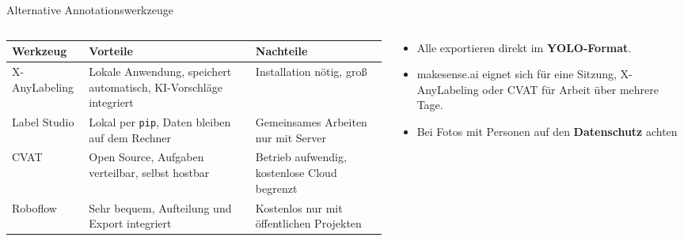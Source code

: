 \begin{frame}{Alternative Annotationswerkzeuge}
\footnotesize
\begin{columns}
\begin{column}{0.60\textwidth}
\centering
\scriptsize
\begin{tabular}{>{\raggedright\arraybackslash}p{}>{\raggedright\arraybackslash}p{}>{\raggedright\arraybackslash}p{}}
\toprule
\textbf{Werkzeug} & \textbf{Vorteile} & \textbf{Nachteile} \\
\midrule
X-AnyLabeling & Lokale Anwendung, speichert automatisch, KI-Vorschläge integriert & Installation nötig, groß \\
\midrule
Label Studio & Lokal per \texttt{pip}, Daten bleiben auf dem Rechner & Gemeinsames Arbeiten nur mit Server \\
\midrule
CVAT & Open Source, Aufgaben verteilbar, selbst hostbar & Betrieb aufwendig, kostenlose Cloud begrenzt \\
\midrule
Roboflow & Sehr bequem, Aufteilung und Export integriert & Kostenlos nur mit öffentlichen Projekten \\
\bottomrule
\end{tabular}
\end{column}
\begin{column}{0.35\textwidth}
\begin{itemize}
  \item Alle exportieren direkt im \textbf{YOLO-Format}.
  \item makesense.ai eignet sich für eine Sitzung, X-AnyLabeling oder CVAT für Arbeit über mehrere Tage.
  \item Bei Fotos mit Personen auf den \textbf{Datenschutz} achten
\end{itemize}
\end{column}
\end{columns}
\end{frame}

